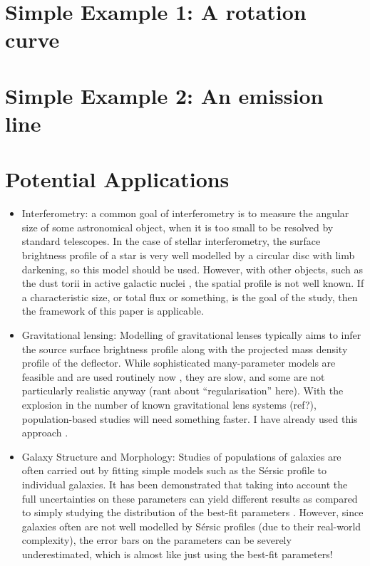 \documentclass[letterpaper, 11pt]{article}
\begin{document}
\section{Simple Example 1: A rotation curve}

\section{Simple Example 2: An emission line}


\section{Potential Applications}

\begin{itemize}
\item Interferometry: a common goal of interferometry is to measure the angular size of some astronomical object, when it is too small to be resolved by standard telescopes. In the case of stellar interferometry, the surface brightness profile of a star is very well modelled by a circular disc with limb darkening, so this model should be used. However, with other objects, such as the dust torii in active galactic nuclei \citep[e.g.][]{2011A&A...536A..78K}, the spatial profile is not well known. If a characteristic size, or total flux or something, is the goal of the study, then the framework of this paper is applicable.\\

\item Gravitational lensing: Modelling of gravitational lenses typically aims to infer the source surface brightness profile along with the projected mass density profile of the deflector. While sophisticated many-parameter models are feasible and are used routinely now \citep{2006MNRAS.371..983S, 2007ApJ...666..726B, 2011MNRAS.412.2521B, 2006ApJ...637..608B, 2012Natur.481..341V}, they are slow, and some are not particularly realistic anyway (rant about ``regularisation'' here). With the explosion in the number of known gravitational lens systems (ref?), population-based studies will need something faster. I have already used this approach \citep{2012arXiv1201.1677B}.

\item Galaxy Structure and Morphology: Studies of populations of galaxies are often carried out by fitting simple models such as the S{\'e}rsic \citep{Sersic1968} profile to individual galaxies. It has been demonstrated that taking into account the full uncertainties on these parameters can yield different results as compared to simply studying the distribution of the best-fit parameters \citep[e.g.][]{2011MNRAS.414.1625Y}. However, since galaxies often are not well modelled by S{\'e}rsic profiles (due to their real-world complexity), the error bars on the parameters can be severely underestimated, which is almost like just using the best-fit parameters! \\


\end{itemize}
\end{document}
